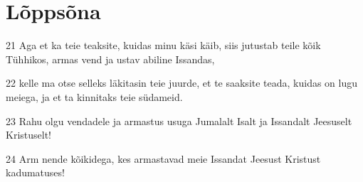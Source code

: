 \section*{Lõppsõna}

\par 21 Aga et ka teie teaksite, kuidas minu käsi käib, siis jutustab teile kõik Tühhikos, armas vend ja ustav abiline Issandas,
\par 22 kelle ma otse selleks läkitasin teie juurde, et te saaksite teada, kuidas on lugu meiega, ja et ta kinnitaks teie südameid.
\par 23 Rahu olgu vendadele ja armastus usuga Jumalalt Isalt ja Issandalt Jeesuselt Kristuselt!
\par 24 Arm nende kõikidega, kes armastavad meie Issandat Jeesust Kristust kadumatuses!







